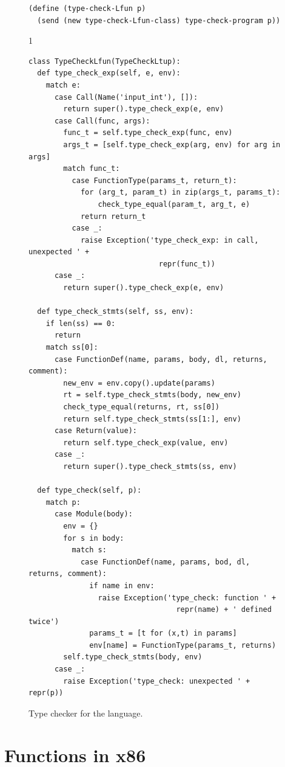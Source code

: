 \documentclass[7x10]{TimesAPriori_MIT}%
\def\pythonEd{1}
\def\edition{0}
\numberwithin{theorem}{chapter}
\numberwithin{definition}{chapter}
\numberwithin{equation}{chapter}
\begin{document}
\begin{figure}[tp]
\begin{tcolorbox}[colback=white]
{\begin{lstlisting}[basicstyle=\ttfamily\footnotesize]
(define (type-check-Lfun p)
  (send (new type-check-Lfun-class) type-check-program p))
\end{lstlisting}
\fi}
{\if\edition\pythonEd
\begin{lstlisting}  
class TypeCheckLfun(TypeCheckLtup):
  def type_check_exp(self, e, env):
    match e:
      case Call(Name('input_int'), []):
        return super().type_check_exp(e, env)      
      case Call(func, args):
        func_t = self.type_check_exp(func, env)
        args_t = [self.type_check_exp(arg, env) for arg in args]
        match func_t:
          case FunctionType(params_t, return_t):
            for (arg_t, param_t) in zip(args_t, params_t):
                check_type_equal(param_t, arg_t, e)
            return return_t
          case _:
            raise Exception('type_check_exp: in call, unexpected ' +
                              repr(func_t))
      case _:
        return super().type_check_exp(e, env)

  def type_check_stmts(self, ss, env):
    if len(ss) == 0:
      return
    match ss[0]:
      case FunctionDef(name, params, body, dl, returns, comment):
        new_env = env.copy().update(params)
        rt = self.type_check_stmts(body, new_env)
        check_type_equal(returns, rt, ss[0])
        return self.type_check_stmts(ss[1:], env)
      case Return(value):
        return self.type_check_exp(value, env)
      case _:
        return super().type_check_stmts(ss, env)

  def type_check(self, p):
    match p:
      case Module(body):
        env = {}
        for s in body:
          match s:
            case FunctionDef(name, params, bod, dl, returns, comment):
              if name in env:
                raise Exception('type_check: function ' +
                                  repr(name) + ' defined twice')
              params_t = [t for (x,t) in params]
              env[name] = FunctionType(params_t, returns)
        self.type_check_stmts(body, env)
      case _:
        raise Exception('type_check: unexpected ' + repr(p))
\end{lstlisting}
\fi}
  \end{tcolorbox}

  \caption{Type checker for the \LangFun{} language.}
\label{fig:type-check-Lfun}
\end{figure}


\clearpage

\section{Functions in x86}
\label{sec:fun-x86}
\end{document}
